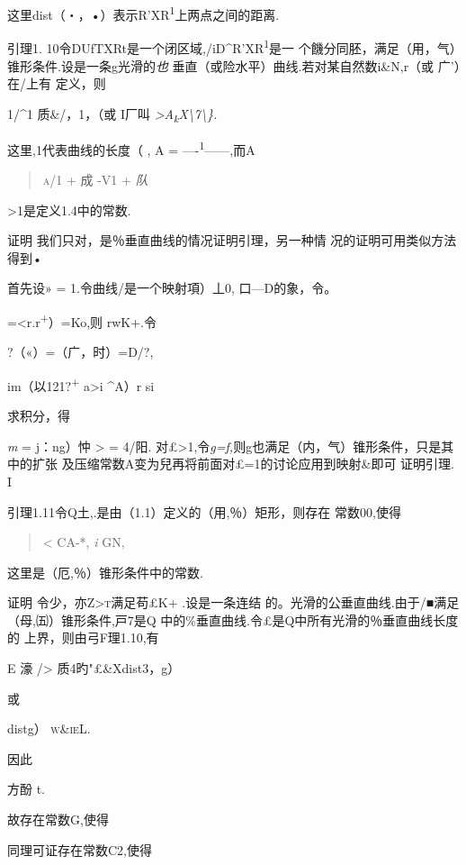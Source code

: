 \documentclass{article}
\begin{document}
这里dist（・，•）表示R'XR\textsuperscript{1}上两点之间的距离.

引理1. 10令DUfTXRt是一个闭区域,/iD\^{}R'XR\textsuperscript{1}是一
个饑分同胚，满足（用，气）锥形条件.设是一条g光滑的\emph{也}
垂直（或险水平）曲线.若对某自然数i\&N,r（或 广'）在/上有 定义，则

1/\^{}1 质\&/\textbar{}，1，（或 I厂叫
\emph{\textgreater{}A\textsubscript{k}X\textbackslash{}7\textbackslash{}\}.}

这里\textbar{},1代表曲线的长度（ , A = ----\textsuperscript{1}------,而A

\begin{quote}
\textsc{a/1} + 成 -V1 + \emph{队}
\end{quote}

\textgreater{}1是定义1.4中的常数.

证明 我们只对，是％垂直曲线的情况证明引理，另一种情
况的证明可用类似方法得到•

首先设» = 1.令曲线/是一个映射項）丄0, 口---D的象，令。

=\textless{}r.r\textsuperscript{+}）=Ko,则 rwK+.令

?（«）=（广，时）=D/?,

im（以121?\textsuperscript{+} a\textgreater{}i \^{}A）r si

求积分，得

\emph{m} = j：ng）忡 \textgreater{} = 4/阳.
对£\textgreater{}1,令\emph{g=f,}则g也满足（内，气）锥形条件，只是其中的扩张
及压缩常数A变为兒再将前面对£=1的讨论应用到映射\&即可 证明引理. I

引理1.11令Q土,.是由（1.1）定义的（用,％）矩形，则存在 常数00,使得

\begin{quote}
\textless{} CA-*, \emph{i} GN,
\end{quote}

这里是（厄,％）锥形条件中的常数.

证明 令少，亦\textsc{Z\textgreater{}t}满足苟£K+ .设是一条连结
的。光滑的公垂直曲线.由于/■满足（母,㈤）锥形条件,戸7是Q
中的\%垂直曲线.令£是Q中所有光滑的％垂直曲线长度的 上界，则由弓F理1.10,有

E 濠 \textbar{}/\textgreater{}\textbar{} 质4旳"£\&Xdist3，g）

或

distg） \textsc{w\&ieL.}

因此

方酚 t.

故存在常数G,使得

同理可证存在常数C2,使得
\end{document}
